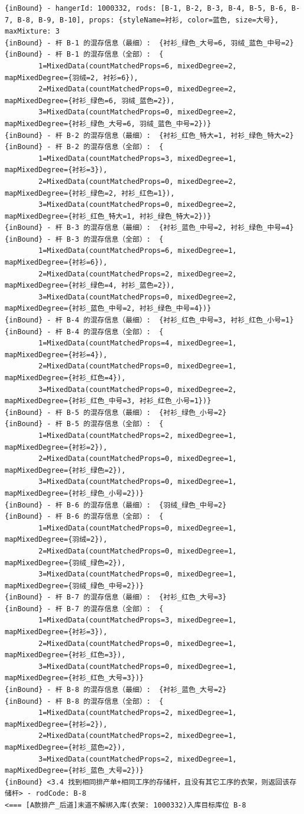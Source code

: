 {\begin{verbatim}
{inBound} - hangerId: 1000332, rods: [B-1, B-2, B-3, B-4, B-5, B-6, B-7, B-8, B-9, B-10], props: {styleName=衬衫, color=蓝色, size=大号}, maxMixture: 3
{inBound} - 杆 B-1 的混存信息（最细）:  {衬衫_绿色_大号=6, 羽绒_蓝色_中号=2}
{inBound} - 杆 B-1 的混存信息（全部）:  {
		1=MixedData(countMatchedProps=6, mixedDegree=2, mapMixedDegree={羽绒=2, 衬衫=6}), 
		2=MixedData(countMatchedProps=0, mixedDegree=2, mapMixedDegree={衬衫_绿色=6, 羽绒_蓝色=2}), 
		3=MixedData(countMatchedProps=0, mixedDegree=2, mapMixedDegree={衬衫_绿色_大号=6, 羽绒_蓝色_中号=2})}
{inBound} - 杆 B-2 的混存信息（最细）:  {衬衫_红色_特大=1, 衬衫_绿色_特大=2}
{inBound} - 杆 B-2 的混存信息（全部）:  {
		1=MixedData(countMatchedProps=3, mixedDegree=1, mapMixedDegree={衬衫=3}), 
		2=MixedData(countMatchedProps=0, mixedDegree=2, mapMixedDegree={衬衫_绿色=2, 衬衫_红色=1}), 
		3=MixedData(countMatchedProps=0, mixedDegree=2, mapMixedDegree={衬衫_红色_特大=1, 衬衫_绿色_特大=2})}
{inBound} - 杆 B-3 的混存信息（最细）:  {衬衫_蓝色_中号=2, 衬衫_绿色_中号=4}
{inBound} - 杆 B-3 的混存信息（全部）:  {
		1=MixedData(countMatchedProps=6, mixedDegree=1, mapMixedDegree={衬衫=6}), 
		2=MixedData(countMatchedProps=2, mixedDegree=2, mapMixedDegree={衬衫_绿色=4, 衬衫_蓝色=2}), 
		3=MixedData(countMatchedProps=0, mixedDegree=2, mapMixedDegree={衬衫_蓝色_中号=2, 衬衫_绿色_中号=4})}
{inBound} - 杆 B-4 的混存信息（最细）:  {衬衫_红色_中号=3, 衬衫_红色_小号=1}
{inBound} - 杆 B-4 的混存信息（全部）:  {
		1=MixedData(countMatchedProps=4, mixedDegree=1, mapMixedDegree={衬衫=4}), 
		2=MixedData(countMatchedProps=0, mixedDegree=1, mapMixedDegree={衬衫_红色=4}), 
		3=MixedData(countMatchedProps=0, mixedDegree=2, mapMixedDegree={衬衫_红色_中号=3, 衬衫_红色_小号=1})}
{inBound} - 杆 B-5 的混存信息（最细）:  {衬衫_绿色_小号=2}
{inBound} - 杆 B-5 的混存信息（全部）:  {
		1=MixedData(countMatchedProps=2, mixedDegree=1, mapMixedDegree={衬衫=2}), 
		2=MixedData(countMatchedProps=0, mixedDegree=1, mapMixedDegree={衬衫_绿色=2}), 
		3=MixedData(countMatchedProps=0, mixedDegree=1, mapMixedDegree={衬衫_绿色_小号=2})}
{inBound} - 杆 B-6 的混存信息（最细）:  {羽绒_绿色_中号=2}
{inBound} - 杆 B-6 的混存信息（全部）:  {
		1=MixedData(countMatchedProps=0, mixedDegree=1, mapMixedDegree={羽绒=2}), 
		2=MixedData(countMatchedProps=0, mixedDegree=1, mapMixedDegree={羽绒_绿色=2}), 
		3=MixedData(countMatchedProps=0, mixedDegree=1, mapMixedDegree={羽绒_绿色_中号=2})}
{inBound} - 杆 B-7 的混存信息（最细）:  {衬衫_红色_大号=3}
{inBound} - 杆 B-7 的混存信息（全部）:  {
		1=MixedData(countMatchedProps=3, mixedDegree=1, mapMixedDegree={衬衫=3}), 
		2=MixedData(countMatchedProps=0, mixedDegree=1, mapMixedDegree={衬衫_红色=3}), 
		3=MixedData(countMatchedProps=0, mixedDegree=1, mapMixedDegree={衬衫_红色_大号=3})}
{inBound} - 杆 B-8 的混存信息（最细）:  {衬衫_蓝色_大号=2}
{inBound} - 杆 B-8 的混存信息（全部）:  {
		1=MixedData(countMatchedProps=2, mixedDegree=1, mapMixedDegree={衬衫=2}), 
		2=MixedData(countMatchedProps=2, mixedDegree=1, mapMixedDegree={衬衫_蓝色=2}), 
		3=MixedData(countMatchedProps=2, mixedDegree=1, mapMixedDegree={衬衫_蓝色_大号=2})}
{inBound} <3.4 找到相同排产单+相同工序的存储杆，且没有其它工序的衣架，则返回该存储杆> - rodCode: B-8
<=== [A款排产_后道]末道不解绑入库(衣架: 1000332)入库目标库位 B-8


\end{verbatim}}
